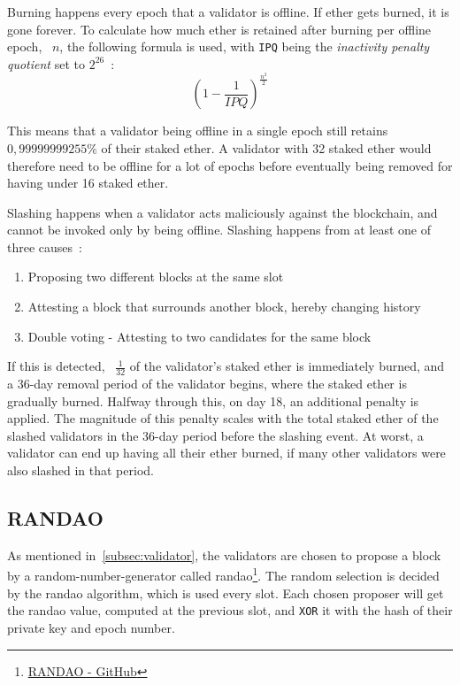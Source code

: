 Burning happens every epoch that a validator is offline.
If ether gets burned, it is gone forever.
To calculate how much ether is retained after burning per offline epoch, ~$n$, the following formula is used, with \texttt{IPQ} being the \textit{inactivity penalty quotient} set to $2^{26}$~\cite{consensus-spec-phase-0}:
\begin{equation}
    \left(1-\frac{1}{IPQ}\right)^\frac{n^2}{2}
    \label{eq:burn}
\end{equation}


This means that a validator being offline in a single epoch still retains $0,99999999255\%$ of their staked ether\@.
A validator with 32 staked ether would therefore need
to be offline for a lot of epochs before eventually being removed for having under 16 staked ether\@.


Slashing happens when a validator acts maliciously against the blockchain,
and cannot be invoked only by being offline.
Slashing happens from at least one of three causes~\cite{PoSRewAndPen}:
\begin{enumerate}
    \item Proposing two different blocks at the same slot
    \item Attesting a block that surrounds another block, hereby changing history
    \item Double voting - Attesting to two candidates for the same block
\end{enumerate}
If this is detected, ~$\frac{1}{32}$ of the validator's staked ether is immediately burned,
and a 36-day removal period of the validator begins, where the staked ether is gradually burned.
Halfway through this, on day 18, an additional penalty is applied.
The magnitude of this penalty scales with the total staked ether of the slashed validators in the 36-day period before the slashing event.
At worst, a validator can end up having all their ether burned, if many other validators were also slashed in that period.

\subsection{RANDAO}\label{subsec:randao}
As mentioned in~\autoref{subsec:validator}, the validators are chosen to propose a block by a random-number-generator called \gls{randao}\footnote{\href{https://github.com/randao/randao}{RANDAO - GitHub}}.
The random selection is decided by the \gls{randao} algorithm, which is used every slot.
Each chosen proposer will get the \gls{randao} value, computed at the previous slot, and \texttt{XOR} it with the hash of their private key and epoch number.


